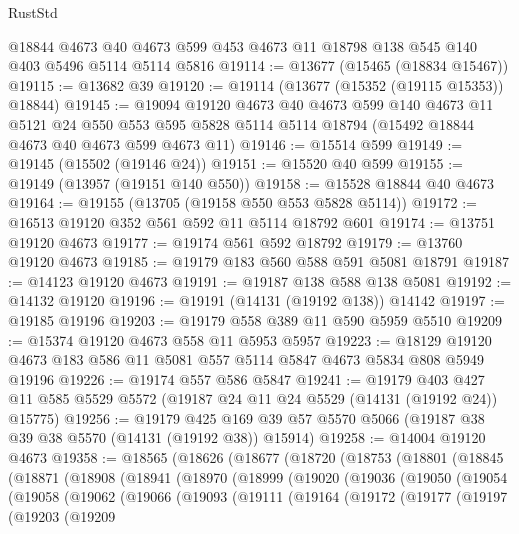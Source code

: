 \begin{lexlean}{RustStd}
\begin{coremodule}
    @18844
    @4673
    @40
    @4673
    @599
    @453
    @4673
    @11
    @18798
    @138
    @545
    @140
    @403
    @5496
    @5114
    @5114
    @5816
@19114 := @13677 (@15465 (@18834 @15467))
@19115 := @13682 @39
@19120 := @19114 (@13677 (@15352 (@19115 @15353)) @18844)
@19145 := @19094
    @19120
    @4673
    @40
    @4673
    @599
    @140
    @4673
    @11
    @5121
    @24
    @550
    @553
    @595
    @5828
    @5114
    @5114
    @18794
    (@15492 @18844 @4673 @40 @4673 @599 @4673 @11)
@19146 := @15514 @599
@19149 := @19145 (@15502 (@19146 @24))
@19151 := @15520 @40 @599
@19155 := @19149 (@13957 (@19151 @140 @550))
@19158 := @15528 @18844 @40 @4673
@19164 := @19155 (@13705 (@19158 @550 @553 @5828 @5114))
@19172 := @16513 @19120 @352 @561 @592 @11 @5114 @18792 @601
@19174 := @13751 @19120 @4673
@19177 := @19174 @561 @592 @18792
@19179 := @13760 @19120 @4673
@19185 := @19179 @183 @560 @588 @591 @5081 @18791
@19187 := @14123 @19120 @4673
@19191 := @19187 @138 @588 @138 @5081
@19192 := @14132 @19120
@19196 := @19191 (@14131 (@19192 @138)) @14142
@19197 := @19185 @19196
@19203 := @19179 @558 @389 @11 @590 @5959 @5510
@19209 := @15374 @19120 @4673 @558 @11 @5953 @5957
@19223 := @18129 @19120 @4673 @183 @586 @11 @5081 @557 @5114 @5847 @4673 @5834 @808 @5949 @19196
@19226 := @19174 @557 @586 @5847
@19241 := @19179
    @403
    @427
    @11
    @585
    @5529
    @5572
    (@19187 @24 @11 @24 @5529 (@14131 (@19192 @24)) @15775)
@19256 := @19179
    @425
    @169
    @39
    @57
    @5570
    @5066
    (@19187 @38 @39 @38 @5570 (@14131 (@19192 @38)) @15914)
@19258 := @14004 @19120 @4673
@19358 := @18565
    (@18626
      (@18677
        (@18720
          (@18753
            (@18801
              (@18845
                (@18871
                  (@18908
                    (@18941
                      (@18970
                        (@18999
                          (@19020
                            (@19036
                              (@19050
                                (@19054
                                  (@19058
                                    (@19062
                                      (@19066
                                        (@19093
                                          (@19111
                                            (@19164
                                              (@19172
                                                (@19177
                                                  (@19197
                                                    (@19203
                                                      (@19209

\end{coremodule}
\end{lexlean}
